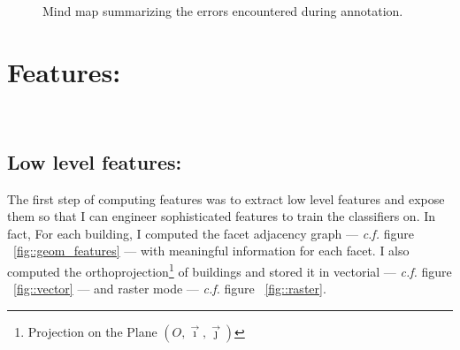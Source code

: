 \documentclass[a4paper, 11pt]{article}
\begin{document}
	\begin{landscape}
		\begin{figure}
			\begin{center}
				
				\caption{\label{fig::mindmap_errors} Mind map summarizing the errors encountered during annotation.}
			\end{center}
		\end{figure}
	\end{landscape}

	\section{Features:}
~\\

	\subsection{Low level features:}


	The first step of computing features was to extract low level features and
	expose them so that I can engineer sophisticated features to train the
	classifiers on. In fact, For each building, I computed the facet adjacency
	graph --- \textit{c.f.} figure ~\ref{fig::geom_features} --- with meaningful
	information for each facet. I also computed the orthoprojection\footnote{Projection
	on the Plane $(O, \vec{\imath}, \vec{\jmath})$} of buildings and stored it
	in vectorial --- \textit{c.f.} figure ~\ref{fig::vector} --- and raster mode
	--- \textit{c.f.} figure ~\ref{fig::raster}.\\
\end{document}
